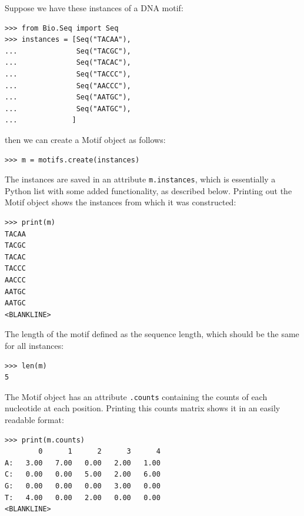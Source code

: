 \documentclass{report}
\begin{document}
Suppose we have these instances of a DNA motif:
\begin{verbatim}
>>> from Bio.Seq import Seq
>>> instances = [Seq("TACAA"),
...              Seq("TACGC"),
...              Seq("TACAC"),
...              Seq("TACCC"),
...              Seq("AACCC"),
...              Seq("AATGC"),
...              Seq("AATGC"),
...             ]
\end{verbatim}
then we can create a Motif object as follows:
\begin{verbatim}
>>> m = motifs.create(instances)
\end{verbatim}
The instances are saved in an attribute \verb+m.instances+, which is essentially a Python list with some added functionality, as described below.
Printing out the Motif object shows the instances from which it was constructed:
\begin{verbatim}
>>> print(m)
TACAA
TACGC
TACAC
TACCC
AACCC
AATGC
AATGC
<BLANKLINE>
\end{verbatim}
The length of the motif defined as the sequence length, which should be the same for all instances:
\begin{verbatim}
>>> len(m)
5
\end{verbatim}
The Motif object has an attribute \verb+.counts+ containing the counts of each
nucleotide at each position. Printing this counts matrix shows it in an easily readable format:
\begin{verbatim}
>>> print(m.counts)
        0      1      2      3      4
A:   3.00   7.00   0.00   2.00   1.00
C:   0.00   0.00   5.00   2.00   6.00
G:   0.00   0.00   0.00   3.00   0.00
T:   4.00   0.00   2.00   0.00   0.00
<BLANKLINE>
\end{verbatim}
\end{document}
